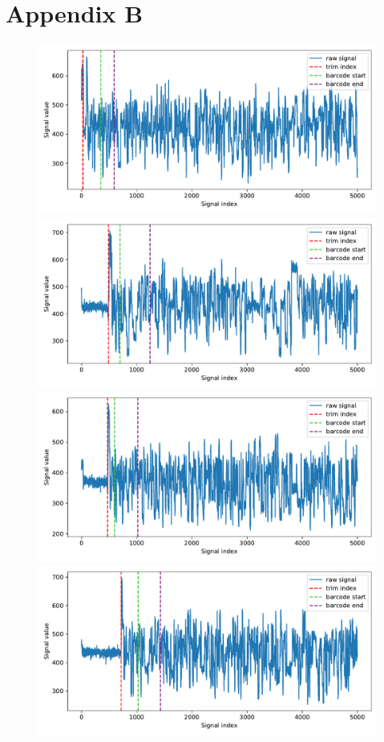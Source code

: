 \chapter*{\vspace{-4cm}Appendix B}

\begin{figure}[ht] %
\includegraphics[scale=0.4]{images/trims/1554.pdf}\\
\includegraphics[scale=0.4]{images/trims/1552.pdf}\\
\includegraphics[scale=0.4]{images/trims/1581.pdf}\\
\includegraphics[scale=0.4]{images/trims/1660.pdf}


\end{figure}
